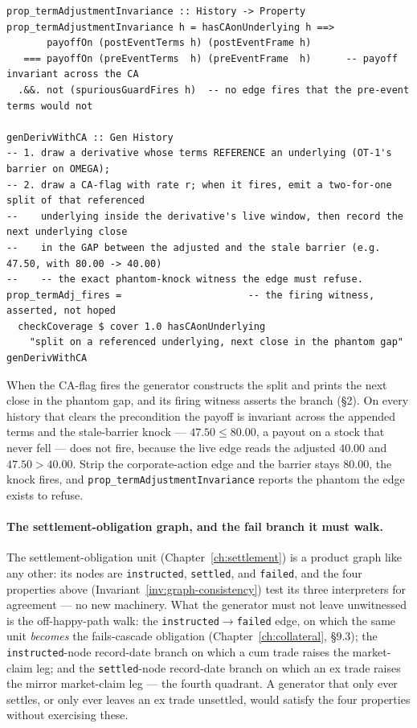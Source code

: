 \begin{lstlisting}
prop_termAdjustmentInvariance :: History -> Property
prop_termAdjustmentInvariance h = hasCAonUnderlying h ==>
       payoffOn (postEventTerms h) (postEventFrame h)
   === payoffOn (preEventTerms  h) (preEventFrame  h)      -- payoff invariant across the CA
  .&&. not (spuriousGuardFires h)  -- no edge fires that the pre-event terms would not

genDerivWithCA :: Gen History
-- 1. draw a derivative whose terms REFERENCE an underlying (OT-1's barrier on OMEGA);
-- 2. draw a CA-flag with rate r; when it fires, emit a two-for-one split of that referenced
--    underlying inside the derivative's live window, then record the next underlying close
--    in the GAP between the adjusted and the stale barrier (e.g. 47.50, with 80.00 -> 40.00)
--    -- the exact phantom-knock witness the edge must refuse.
prop_termAdj_fires =                      -- the firing witness, asserted, not hoped
  checkCoverage $ cover 1.0 hasCAonUnderlying
    "split on a referenced underlying, next close in the phantom gap" genDerivWithCA
\end{lstlisting}

When the CA-flag fires the generator constructs the split and prints the next close in the
phantom gap, and its firing witness asserts the branch (\S 2). On every history that clears
the precondition the payoff is invariant across the appended terms and the stale-barrier
knock --- $47.50 \le 80.00$, a payout on a stock that never fell --- does not fire, because
the live edge reads the adjusted $40.00$ and $47.50 > 40.00$. Strip the corporate-action edge
and the barrier stays $80.00$, the knock fires, and \texttt{prop\_termAdjustmentInvariance}
reports the phantom the edge exists to refuse.

\paragraph{The settlement-obligation graph, and the fail branch it must walk.} The
settlement-obligation unit (Chapter~\ref{ch:settlement}) is a product graph like any
other: its nodes are \texttt{instructed}, \texttt{settled}, and \texttt{failed}, and the
four properties above (Invariant~\ref{inv:graph-consistency}) test its three interpreters
for agreement --- no new machinery. What the generator must not leave unwitnessed is the
off-happy-path walk: the \texttt{instructed}$\to$\texttt{failed} edge, on which the same
unit \emph{becomes} the fails-cascade obligation (Chapter~\ref{ch:collateral}, \S9.3); the
\texttt{instructed}-node record-date branch on which a cum trade raises the market-claim
leg; and the \texttt{settled}-node record-date branch on which an ex trade raises the
mirror market-claim leg --- the fourth quadrant. A generator that only ever settles, or
only ever leaves an ex trade unsettled, would satisfy the four properties without
exercising these.

